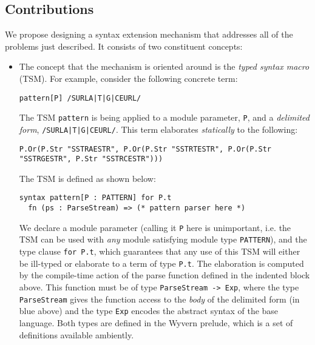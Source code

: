 \subsection{Contributions}\label{sec:syntax-contributions}
We propose designing a  syntax extension mechanism that addresses all of the problems just described. It consists of two constituent concepts:
\begin{itemize}
\item The concept that the mechanism is oriented around is the \emph{typed syntax macro} (TSM). %
For example, consider the following concrete term:
\begin{lstlisting}[numbers=none]
pattern[P] /SURLA|T|G|CEURL/
\end{lstlisting}

The TSM \lstinline{pattern} is being applied to a module parameter, \lstinline{P}, and a \emph{delimited form}, \lstinline{/SURLA|T|G|CEURL/}. This term elaborates \emph{statically} to the following:

\begin{lstlisting}[numbers=none]
P.Or(P.Str "SSTRAESTR", P.Or(P.Str "SSTRTESTR", P.Or(P.Str "SSTRGESTR", P.Str "SSTRCESTR")))
\end{lstlisting}

The TSM is defined as shown below:
\begin{lstlisting}[numbers=none]
syntax pattern[P : PATTERN] for P.t
  fn (ps : ParseStream) => (* pattern parser here *)
\end{lstlisting}
We declare a module parameter (calling it \lstinline{P} here is unimportant, i.e. the TSM can be used with \emph{any} module satisfying module type \lstinline{PATTERN}), and the type clause \lstinline{for P.t}, which guarantees that any use of this TSM will either be ill-typed or elaborate to a term of type \lstinline{P.t}. The elaboration is computed by the compile-time action of the parse function defined in the indented block above. This function must be of type \lstinline{ParseStream -> Exp}, where the type \lstinline{ParseStream} gives the function access to the \emph{body} of the delimited form (in blue above) and the type \lstinline{Exp}  encodes the abstract syntax of the base language. Both types are defined in the Wyvern prelude, which is a set of definitions available ambiently.


\end{itemize}
